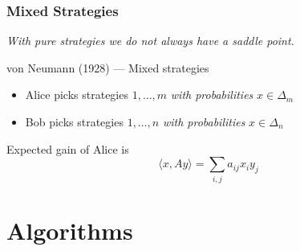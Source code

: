 \documentclass[aspectratio=149]{beamer}
\begin{document}
\begin{frame}
  \frametitle{Mixed Strategies}
  \textit{With pure strategies we do not always have a saddle point.}

  \begin{block}{von Neumann (1928) --- Mixed strategies}
    \begin{itemize}
      \item Alice picks strategies $1, \dots, m$ \emph{with probabilities} $x\in \Delta_m$
      \item Bob picks strategies $1, \dots, n$ \emph{with probabilities} $x\in \Delta_n$
    \end{itemize}
    Expected gain of Alice is
    \begin{equation}
      \langle x, Ay \rangle = \sum_{i,j} a_{ij} x_i y_j
    \end{equation}
  \end{block}
\end{frame}

\section{Algorithms}%
\label{sec:}
\end{document}
